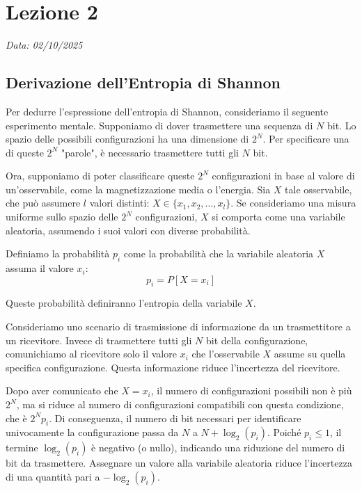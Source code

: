 \chapter{Lezione 2}
\label{chap:lezione_02} 

\begin{flushright}
\textit{Data: 02/10/2025}
\end{flushright}



\section{Derivazione dell'Entropia di Shannon}

Per dedurre l'espressione dell'entropia di Shannon, consideriamo il seguente esperimento mentale. Supponiamo di dover trasmettere una sequenza di $N$ bit. Lo spazio delle possibili configurazioni ha una dimensione di $2^N$. Per specificare una di queste $2^N$ "parole", è necessario trasmettere tutti gli $N$ bit.

Ora, supponiamo di poter classificare queste $2^N$ configurazioni in base al valore di un'osservabile, come la magnetizzazione media o l'energia. Sia $X$ tale osservabile, che può assumere $l$ valori distinti: $X \in \{x_1, x_2, \dots, x_l\}$.
Se consideriamo una misura uniforme sullo spazio delle $2^N$ configurazioni, $X$ si comporta come una variabile aleatoria, assumendo i suoi valori con diverse probabilità.

Definiamo la probabilità $p_i$ come la probabilità che la variabile aleatoria $X$ assuma il valore $x_i$:
\begin{equation}
 p_i = P[X = x_i]
\end{equation}

Queste probabilità definiranno l'entropia della variabile $X$.

Consideriamo uno scenario di trasmissione di informazione da un trasmettitore a un ricevitore. Invece di trasmettere tutti gli $N$ bit della configurazione, comunichiamo al ricevitore solo il valore $x_i$ che l'osservabile $X$ assume su quella specifica configurazione. Questa informazione riduce l'incertezza del ricevitore.

Dopo aver comunicato che $X = x_i$, il numero di configurazioni possibili non è più $2^N$, ma si riduce al numero di configurazioni compatibili con questa condizione, che è $2^N p_i$. Di conseguenza, il numero di bit necessari per identificare univocamente la configurazione passa da $N$ a $N + \log_2(p_i)$. Poiché $p_i \le 1$, il termine $\log_2(p_i)$ è negativo (o nullo), indicando una riduzione del numero di bit da trasmettere. Assegnare un valore alla variabile aleatoria riduce l'incertezza di una quantità pari a $-\log_2(p_i)$.

